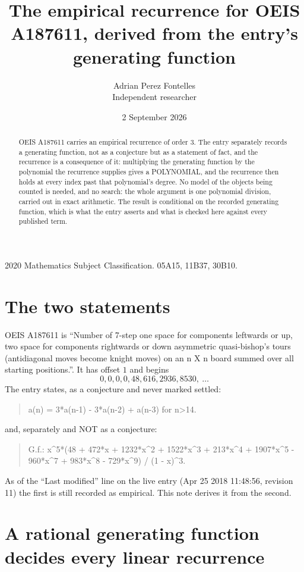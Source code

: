 \documentclass[11pt,a4paper]{article}
\title{The empirical recurrence for OEIS A187611, derived from the entry's generating function}
\author{Adrian Perez Fontelles\\ \small Independent researcher}
\date{2 September 2026}
\theoremstyle{plain}
\theoremstyle{definition}
\begin{document}
\maketitle

\begin{abstract}
OEIS A187611 carries an empirical recurrence of order $3$. The entry separately records a
generating function, not as a conjecture but as a statement of fact, and the recurrence is a
consequence of it: multiplying the generating function by the polynomial the recurrence
supplies gives a POLYNOMIAL, and the recurrence then holds at every index past that
polynomial's degree. No model of the objects being counted is needed, and no search: the
whole argument is one polynomial division, carried out in exact arithmetic. The result is
conditional on the recorded generating function, which is what the entry asserts and what is
checked here against every published term.
\end{abstract}

\noindent\small 2020 Mathematics Subject Classification. 05A15, 11B37, 30B10.\normalsize

\section{The two statements}

OEIS A187611 is ``Number of 7-step one space for components leftwards or up, two space for components rightwards or down asymmetric quasi-bishop's tours (antidiagonal moves become knight moves) on an n X n board summed over all starting positions.''. It has offset $1$ and begins
\[
0, 0, 0, 0, 48, 616, 2936, 8530,\ \dots
\]
The entry states, as a conjecture and never marked settled:
\begin{quote}
a(n) = 3*a(n-1) - 3*a(n-2) + a(n-3) for n>14.
\end{quote}
and, separately and NOT as a conjecture:
\begin{quote}
G.f.: x\^{}5*(48 + 472*x + 1232*x\^{}2 + 1522*x\^{}3 + 213*x\^{}4 + 1907*x\^{}5 - 960*x\^{}7 + 983*x\^{}8 - 729*x\^{}9) / (1 - x)\^{}3.
\end{quote}
As of the ``Last modified'' line on the live entry (Apr 25 2018 11:48:56, revision 11) the first is still
recorded as empirical. This note derives it from the second.

\section{A rational generating function decides every linear recurrence}
\end{document}
